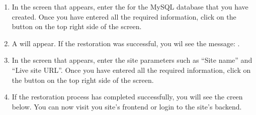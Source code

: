 \documentclass[a4paper,10pt,english,openany,oneside]{sphinxmanual}
\begin{document}
\begin{sloppypar}
\begin{enumerate}
\begin{figure}[H]
\centering

\noindent{}
\end{figure}

\item {} 
\sphinxAtStartPar
In the screen that appears, enter the {\hyperref[\detokenize{joomla-to-vps:credentials}]{}} for the MySQL database that you have created. Once you have entered all the required information, click on the button  on the top right side of the screen.

\begin{figure}[H]
\centering

\noindent{}
\end{figure}

\item {} 
\sphinxAtStartPar
A  will appear. If the restoration was successful, you wil see the message: .
\begin{quote}

\begin{figure}[H]
\centering

\noindent{}
\end{figure}
\end{quote}

\item {} 
\sphinxAtStartPar
In the screen that appears, enter the site parameters such as “Site name” and “Live site URL”. Once you have entered all the required information, click on the button  on the top right side of the screen.
\begin{quote}

\begin{figure}[H]
\centering

\noindent{}
\end{figure}
\end{quote}

\item {} 
\sphinxAtStartPar
If the restoration process has completed successfully, you will see the creen below. You can now visit you site’s frontend or login to the site’s backend.
\begin{quote}


\end{quote}
\end{enumerate}
\end{sloppypar}
\end{document}
